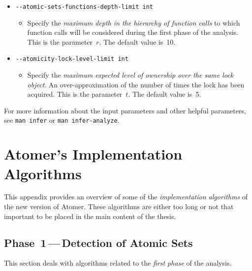 \begin{itemize}[label={}]
    \item \texttt{-{}-atomic-sets-functions-depth-limit int}
    \begin{itemize}
        \item Specify the \emph{maximum depth in the hierarchy of function calls} to which function calls will be considered during the first phase of the analysis. This is the parameter~$ r $. The default value is~10.
    \end{itemize}
    
    \item \texttt{-{}-atomicity-lock-level-limit int}
    \begin{itemize}
        \item Specify the \emph{maximum expected level of ownership over the same lock object}. An over-approximation of the number of times the lock has been acquired. This is the parameter~$ t $. The default value is~5.
    \end{itemize}
\end{itemize}
For more information about the input parameters and other helpful parameters, see \texttt{man infer} or \texttt{man infer-analyze}.






\chapter{Atomer's Implementation Algorithms}
\label{app:alg}

This appendix provides an overview of some of the \emph{implementation algorithms} of the new version of Atomer. These algorithms are either too long or not that important to be placed in the main content of the thesis.


\section*{Phase~1\,---\,Detection of Atomic Sets}

This section deals with algorithms related to the \emph{first phase} of the analysis.

\vfill

